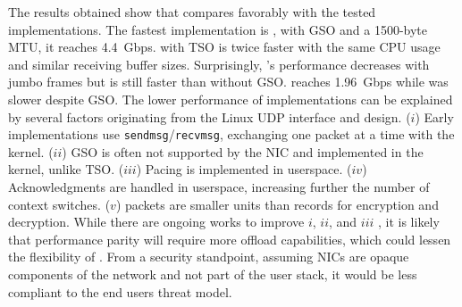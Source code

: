 The results obtained show that \tcpls compares favorably
with the tested \quic implementations. The fastest \quic implementation is
\quicly, with GSO and a 1500-byte MTU, it reaches 4.4~Gbps. \tcpls with TSO is 
twice faster with the same CPU usage and similar 
receiving buffer sizes. Surprisingly, \quicly's performance decreases with
jumbo frames but is still faster than without GSO.  \msquic reaches
1.96~Gbps while \mvfst was slower despite GSO. 
The lower performance of \quic implementations can be explained by several 
factors originating from the Linux UDP interface and \quic design.
($i$) Early \quic implementations use \texttt{sendmsg}/\texttt{recvmsg}, 
exchanging one packet at a time with the kernel.
($ii$) GSO is often not supported by the NIC and implemented in the kernel, 
unlike TSO.
($iii$) Pacing is implemented in userspace.
($iv$) Acknowledgments are handled in userspace, increasing further the number 
of context switches.
($v$) \quic packets are smaller units than \tls records for encryption and 
decryption.
While there are ongoing works to improve $i$, $ii$, and $iii$ 
\cite{udp-gso-pacing}, it is likely that 
performance parity will require more offload capabilities, which could lessen 
the flexibility of \quic. From a security standpoint, assuming NICs are opaque 
components of the network and not part of the user stack, it would be less 
compliant to the end users threat model.


